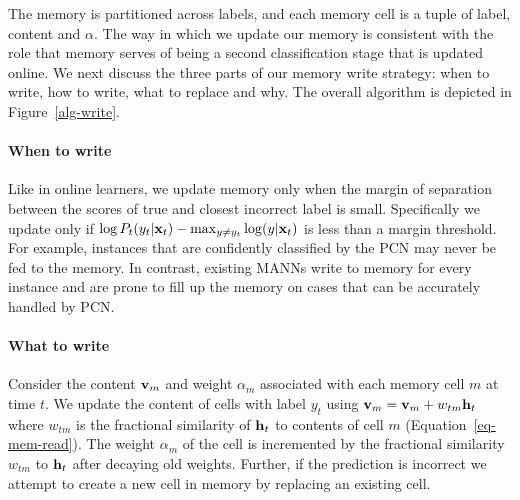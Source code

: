 \documentclass[letterpaper]{article} %
\newcommand{\vek}[1]{{\bf {#1}}}
\newcommand{\vx}{{\vek{x}}}
\newcommand{\vh}{{\vek{h}}}
\newcommand{\vM}{{\vek{v}}}
\def\shiv#1{\todo [color=orange]{Shiv: #1}}
\begin{document}
The memory is partitioned across labels, and each memory cell is a tuple of label, content and $\alpha$.  %
The way in which we update our memory is consistent with the role that memory serves of being a second classification stage that is updated online.  We next discuss the three parts of our memory write strategy: when to write, how to write, what to replace and why. The overall algorithm is depicted in Figure~\ref{alg-write}.
%
\paragraph{When to write}
Like in online learners, we update memory only when the margin of separation between the scores of true and closest incorrect label is small. Specifically we update only if $\log P_t(y_t|\vx_t) - \max_{y \ne y_t} \log (y | \vx_t)$ is less than a margin threshold.  For example, instances that are confidently classified by the PCN may never be fed to the memory.
In contrast,  existing MANNs write to memory for every instance and are prone to fill up the memory on cases that can be accurately handled by PCN.
\paragraph{What to write}
Consider the content $\vM_m$ and weight $\alpha_m$ associated with
each memory cell $m$ at time $t$.   We update the content of cells with label $y_t$ using $\vM_{m} = \vM_{m} + w_{tm}{\vh_t}$ where $w_{tm}$ is the fractional similarity of $\vh_t$ to contents of cell $m$ (Equation~\ref{eq-mem-read}). The weight $\alpha_m$ of the cell is incremented by the fractional similarity $w_{tm}$ to $\vh_t$ after decaying old weights.
Further, if the prediction is incorrect we attempt to create a new cell in memory  by replacing an existing cell.
%
\end{document}
